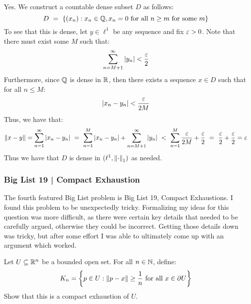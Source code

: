 \begin{soln}
    Yes. We construct a countable dense subset $ D $ as follows:
    \begin{equation*}
        D \ = \ \set{(x_{n}):x_{n}\in\bQ, x_{n} = 0 \trm{ for all } n \geq m
        \trm{ for some } m}
    \end{equation*}
    To see that this is dense, let $ y \in \ell^{1} $ be any sequence and fix
    $ \operatorname{\varepsilon} > 0 $. Note that there must exist some $ M $ such that:
    \begin{equation*}
        \sum_{n=M+1}^{\infty}\abs{y_{n}} < \frac{\operatorname{\varepsilon}}{2}
    \end{equation*}
    Furthermore, since $ \mathbb{Q} $ is dense in $ \mathbb{R} $, then there exists a sequence
    $ x \in D $ such that for all $ n \leq M $:
    \begin{equation*}
        \abs{x_{n}-y_{n}} < \frac{\operatorname{\varepsilon}}{2M}
    \end{equation*}
    Thus, we have that:
    \begin{equation*}
        \norm{x-y} = \sum_{n=1}^{\infty}\abs{x_{n}-y_{n}} \ = \
        \sum_{n=1}^{M}\abs{x_{n}-y_{n}} + \sum_{n=M+1}^{\infty}\abs{y_{n}} \ < \
        \sum_{n=1}^{M}\frac{\ep}{2M} + \frac{\ep}{2} \ = \ \frac{\ep}{2}+
        \frac{\ep}{2} = \ep
    \end{equation*}
    Thus we have that $ D $ is dense in $ (\ell^{1},\left\|\cdot\right\|_{1}) $ as
    needed.
\end{soln}

\newpage
\subsubsection{Big List 19 | Compact Exhaustion}

The fourth featured Big List problem is Big List 19, Compact Exhaustions. I
found this problem to be unexpectedly tricky. Formalizing my ideas for this
question was more difficult, as there were certain key details that needed to be
carefully argued, otherwise they could be incorrect. Getting those details down
was tricky, but after some effort I was able to ultimately come up with an
argument which worked.

\begin{qu}[num=19.1]
    Let $ U \subseteq \mathbb{R}^{n} $ be a bounded open set. For all $ n \in
    \mathbb{N} $, define:
    \begin{equation*}
        K_{n} = \left\{{p \in U : \left\|p - x\right\| \geq \frac{1}{n} \textrm{ for all } x
        \in \partial U}\right\}
    \end{equation*}
    Show that this is a compact exhaustion of $ U $.
\end{qu}

